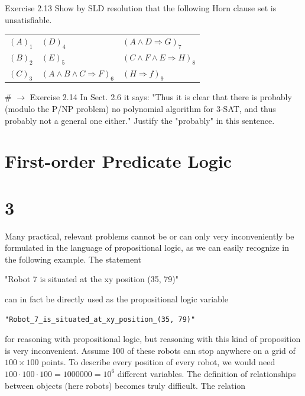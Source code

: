 \documentclass[10pt]{book}
\begin{document}
Exercise 2.13 Show by SLD resolution that the following Horn clause set is unsatisfiable.

\begin{center}
\begin{tabular}{lll}
$(A)_{1}$ & $(D)_{4}$ & $(A \wedge D \Rightarrow G)_{7}$ \\
$(B)_{2}$ & $(E)_{5}$ & $(C \wedge F \wedge E \Rightarrow H)_{8}$ \\
$(C)_{3}$ & $(A \wedge B \wedge C \Rightarrow F)_{6}$ & $(H \Rightarrow f)_{9}$ \\
\end{tabular}
\end{center}

\# $\rightarrow$ Exercise 2.14 In Sect. 2.6 it says: "Thus it is clear that there is probably (modulo the P/NP problem) no polynomial algorithm for 3-SAT, and thus probably not a general one either." Justify the "probably" in this sentence.

\section*{First-order Predicate Logic}
\section*{3}
Many practical, relevant problems cannot be or can only very inconveniently be formulated in the language of propositional logic, as we can easily recognize in the following example. The statement


\begin{displayquote}
"Robot 7 is situated at the xy position (35, 79)"
\end{displayquote}

can in fact be directly used as the propositional logic variable

\begin{verbatim}
"Robot_7_is_situated_at_xy_position_(35, 79)"
\end{verbatim}

for reasoning with propositional logic, but reasoning with this kind of proposition is very inconvenient. Assume 100 of these robots can stop anywhere on a grid of $100 \times 100$ points. To describe every position of every robot, we would need $100 \cdot 100 \cdot 100=1000000=10^{6}$ different variables. The definition of relationships between objects (here robots) becomes truly difficult. The relation
\end{document}
